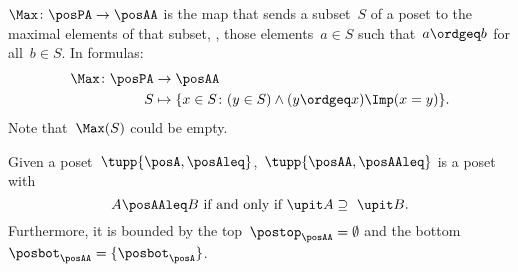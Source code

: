 \begin{definition}[Max]
  \label{def:Max}
  $\Max \colon \posPA \to \posAA$ is the map that sends a subset~$S$ of a poset to the maximal elements of that subset, \ie , those elements~$a \in S$ such that~$a \ordgeq b$ for all~$b \in S$. In formulas:
  \begin{equation*}
    \begin{aligned}
      \Max \colon \posPA &\to \posAA\\
      S&\mapsto \{ x\in S\colon (y\in S)\wedge(y\ordgeq x)\Imp (x=y)\}.
    \end{aligned}
  \end{equation*}
  Note that~$\Max(S)$ could be empty.
\end{definition}


\begin{lemma}
  Given a poset~$\tupp{\posA,\posAleq}$,~$\tupp{\posAA,\posAAleq}$ is a poset with
  \begin{equation}
    \label{eq:orderantichain}
    A\posAAleq B \text{ if and only if } \upit  A \supseteq \ \upit  B.
  \end{equation}
  Furthermore, it is bounded by the top~$\postop_{\posAA}=\emptyset$ and the bottom~$\posbot_{\posAA}=\{\posbot_{\posA}\}$.
\end{lemma}

